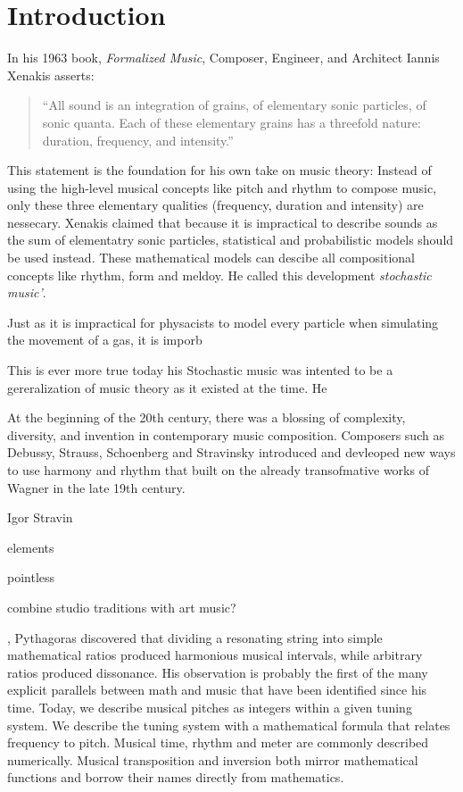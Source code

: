 \cleardoublepage
\chapter{Introduction}
\label{ch:introduction}
In his 1963 book, \textit{Formalized Music}, Composer, Engineer, and
Architect Iannis Xenakis asserts: 
\begin{quotation}
  ``All sound is an integration of grains, of elementary sonic
  particles, of sonic quanta. Each of these elementary grains has a
  threefold nature: duration, frequency, and intensity.''
\end{quotation}
This statement is the foundation for his own take on music theory:
Instead of using the high-level musical concepts like pitch and rhythm
to compose music, only these three elementary qualities (frequency,
duration and intensity) are nessecary. Xenakis claimed that because it
is impractical to describe sounds as the sum of elementatry sonic
particles, statistical and probabilistic models should be used
instead. These mathematical models can descibe all compositional
concepts like rhythm, form and meldoy.  He called this
development \textit{stochastic music'}.



 Just as it is impractical for physacists to model every particle
 when simulating the movement of a gas, it is imporb

This is ever more true today 
 his Stochastic music was intented to be a
gereralization of music theory as it existed at the time. He


At the beginning of the 20th century, there was a blossing of
complexity, diversity, and invention in contemporary music
composition. Composers such as Debussy, Strauss, Schoenberg and
Stravinsky introduced and devleoped new ways to use harmony and rhythm
that built on the already transofmative works of Wagner in the late
19th century.



Igor Stravin



elements

pointless 

combine studio traditions with art music?

, Pythagoras discovered that
dividing a resonating string into simple mathematical ratios produced
harmonious musical intervals, while arbitrary ratios produced
dissonance.  His observation is probably the first of the many
explicit parallels between math and music that have been identified
since his time. Today, we describe musical pitches as integers within
a given tuning system. We describe the tuning system with a
mathematical formula that relates frequency to pitch. Musical time,
rhythm and meter are commonly described numerically. Musical
transposition and inversion both mirror mathematical functions and
borrow their names directly from mathematics.


